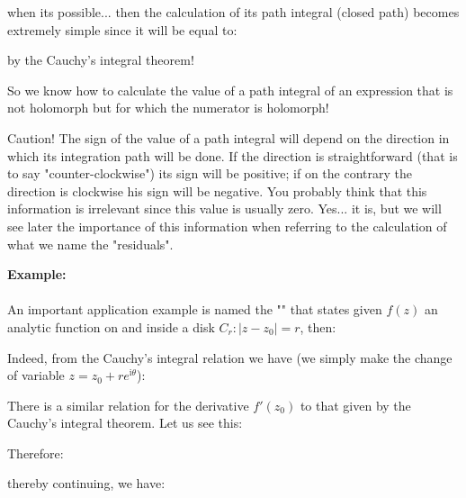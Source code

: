 	when its possible... then the calculation of its path integral (closed path) becomes extremely simple since it will be equal to:
	
	by the Cauchy's integral theorem!
	
	\begin{tcolorbox}[title=Remark,arc=10pt,breakable,drop lifted shadow,
  skin=enhanced,
  skin first is subskin of={enhancedfirst}{arc=10pt,no shadow},
  skin middle is subskin of={enhancedmiddle}{arc=10pt,no shadow},
  skin last is subskin of={enhancedlast}{drop lifted shadow}]
	So we know how to calculate the value of a path integral of an expression that is not holomorph but for which the numerator is holomorph! 
	\end{tcolorbox}
	
	\begin{tcolorbox}[enhanced,colback=red!5!white,colframe=black!50!red,boxrule=1pt,arc=0pt,outer arc=0pt,drop lifted shadow,after skip=10pt plus 2pt]
	\bcbombe Caution! The sign of the value of a path integral will depend on the direction in which its integration path will be done. If the direction is straightforward (that is to say "counter-clockwise") its sign will be positive; if on the contrary the direction is clockwise his sign will be negative. You probably think that this information is irrelevant since this value is usually zero. Yes... it is, but we will see later the importance of this information when referring to the calculation of what we name the "residuals".
	\end{tcolorbox}
		
	\begin{tcolorbox}[colframe=black,colback=white,sharp corners]
	\textbf{{\Large {}}Example:}\\\\
	An important application example is named the "" that states given $f(z)$ an analytic function on and inside a disk $C_r:|z-z_0|=r$, then:
	
	Indeed, from the Cauchy's integral relation we have (we simply make the change of variable $z=z_0+re^{\mathrm{i}\theta}$):
	
	\end{tcolorbox}
	 There is a similar relation for the derivative $f'(z_0)$ to that given by the Cauchy's integral theorem. Let us see this:
	
	Therefore:
	
	thereby continuing, we have:
	
